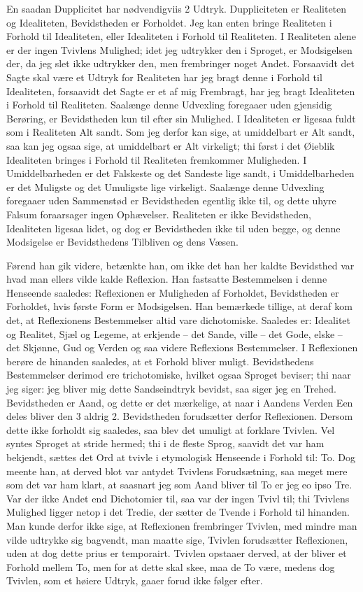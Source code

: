 \documentclass[12pt,a4paper]{article}
\begin{document}
En saadan Dupplicitet har nødvendigviis 2 Udtryk. Duppliciteten er Realiteten og Idealiteten, Bevidstheden er Forholdet. Jeg kan enten bringe Realiteten i Forhold til Idealiteten, eller Idealiteten i Forhold til Realiteten. I Realiteten alene er der ingen Tvivlens Mulighed; idet jeg udtrykker den i Sproget, er Modsigelsen der, da jeg slet ikke udtrykker den, men frembringer noget Andet. Forsaavidt det Sagte skal være et Udtryk for Realiteten har jeg bragt denne i Forhold til Idealiteten, forsaavidt det Sagte er et af mig Frembragt, har jeg bragt Idealiteten i Forhold til Realiteten. Saalænge denne Udvexling foregaaer uden gjensidig Berøring, er Bevidstheden kun til efter sin Mulighed. I Idealiteten er ligesaa fuldt som i Realiteten Alt sandt. Som jeg derfor kan sige, at umiddelbart er Alt sandt, saa kan jeg ogsaa sige, at umiddelbart er Alt virkeligt; thi først i det Øieblik Idealiteten bringes i Forhold til Realiteten fremkommer Muligheden. I Umiddelbarheden er det Falskeste og det Sandeste lige sandt, i Umiddelbarheden er det Muligste og det Umuligste lige virkeligt. Saalænge denne Udvexling foregaaer uden Sammenstød er Bevidstheden egentlig ikke til, og dette uhyre Falsum foraarsager ingen Ophævelser. Realiteten er ikke Bevidstheden, Idealiteten ligesaa lidet, og dog er Bevidstheden ikke til uden begge, og denne Modsigelse er Bevidsthedens Tilbliven og dens Væsen.

Førend han gik videre, betænkte han, om ikke det han her kaldte Bevidsthed var hvad man ellers vilde kalde Reflexion. Han fastsatte Bestemmelsen i denne Henseende saaledes: Reflexionen er Muligheden af Forholdet, Bevidstheden er Forholdet, hvis første Form er Modsigelsen. Han bemærkede tillige, at deraf kom det, at Reflexionens Bestemmelser altid vare dichotomiske. Saaledes er: Idealitet og Realitet, Sjæl og Legeme, at erkjende – det Sande, ville – det Gode, elske – det Skjønne, Gud og Verden og saa videre Reflexions Bestemmelser. I Reflexionen berøre de hinanden saaledes, at et Forhold bliver muligt. Bevidsthedens Bestemmelser derimod ere trichotomiske, hvilket ogsaa Sproget beviser; thi naar jeg siger: jeg bliver mig dette Sandseindtryk bevidst, saa siger jeg en Trehed. Bevidstheden er Aand, og dette er det mærkelige, at naar i Aandens Verden Een deles bliver den 3 aldrig 2. Bevidstheden forudsætter derfor Reflexionen. Dersom dette ikke forholdt sig saaledes, saa blev det umuligt at forklare Tvivlen. Vel syntes Sproget at stride hermed; thi i de fleste Sprog, saavidt det var ham bekjendt, sættes det Ord at tvivle i etymologisk Henseende i Forhold til: To. Dog meente han, at derved blot var antydet Tvivlens Forudsætning, saa meget mere som det var ham klart, at saasnart jeg som Aand bliver til To er jeg eo ipso Tre. Var der ikke Andet end Dichotomier til, saa var der ingen Tvivl til; thi Tvivlens Mulighed ligger netop i det Tredie, der sætter de Tvende i Forhold til hinanden. Man kunde derfor ikke sige, at Reflexionen frembringer Tvivlen, med mindre man vilde udtrykke sig bagvendt, man maatte sige, Tvivlen forudsætter Reflexionen, uden at dog dette prius er temporairt. Tvivlen opstaaer derved, at der bliver et Forhold mellem To, men for at dette skal skee, maa de To være, medens dog Tvivlen, som et høiere Udtryk, gaaer forud ikke følger efter.
\end{document}
